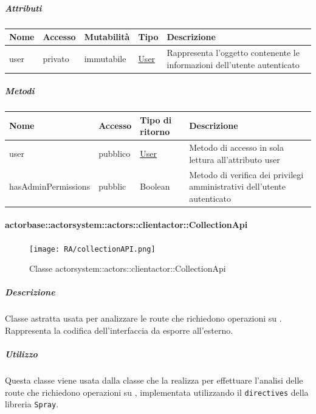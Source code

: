 \documentclass{scalatekids-article}
\begin{document}
\subparagraph{Attributi}
\begin{tabular}{| p{1.5cm} | p{1.5cm} | p{2cm} | p{3cm} | p{8.5cm} |}
  \hline
  Nome & Accesso & Mutabilità & Tipo & Descrizione\\
  \hline
  user & privato & immutabile & \hyperref[sec:actorbase::actorsystem::actors::clientactor::User]{User} & Rappresenta l'oggetto contenente le informazioni dell'utente autenticato\\
  \hline
\end{tabular}

\subparagraph{Metodi}

\begin{tabular}{| p{1.5cm} | p{1.5cm} | p{2.5cm} | p{9.5cm} |}
  \hline
  Nome & Accesso & Tipo di ritorno & Descrizione\\
  \hline
  user & pubblico & \hyperref[sec:actorbase::actorsystem::actors::clientactor::User]{User} & Metodo di accesso in sola lettura all'attributo user\\
  \hline
  hasAdminPermissions & pubblic & Boolean & Metodo di verifica dei privilegi amministrativi dell'utente autenticato\\
  \hline
\end{tabular}

\paragraph{actorbase::actorsystem::actors::clientactor::CollectionApi}
\label{sec:actorbase::actorsystem::actors::clientactor::CollectionApi}

\begin{figure}[H]
  \begin{center}
    \texttt{[image: RA/collectionAPI.png]}
    \caption{Classe actorsystem::actors::clientactor::CollectionApi}
  \end{center}
\end{figure}

\subparagraph{Descrizione}

Classe astratta usata per analizzare le route che richiedono operazioni su
. Rappresenta la codifica dell'interfaccia  da
esporre all'esterno.

\subparagraph{Utilizzo}

Questa classe viene usata dalla classe che la realizza per effettuare l'analisi
delle route che richiedono operazioni su , implementata
utilizzando il  \texttt{directives} della libreria
\texttt{Spray}.
\end{document}
